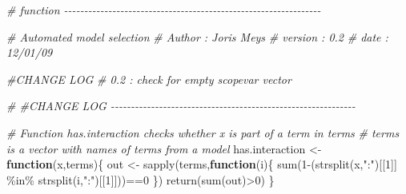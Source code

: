 \documentclass[
]{article}
\newenvironment{Shaded}{\begin{snugshade}}{\end{snugshade}}
\newcommand{\CommentTok}[1]{\textcolor[rgb]{0.56,0.35,0.01}{\textit{#1}}}
\newcommand{\ControlFlowTok}[1]{\textcolor[rgb]{0.13,0.29,0.53}{\textbf{#1}}}
\newcommand{\DecValTok}[1]{\textcolor[rgb]{0.00,0.00,0.81}{#1}}
\newcommand{\FunctionTok}[1]{\textcolor[rgb]{0.00,0.00,0.00}{#1}}
\newcommand{\NormalTok}[1]{#1}
\newcommand{\OtherTok}[1]{\textcolor[rgb]{0.56,0.35,0.01}{#1}}
\newcommand{\SpecialCharTok}[1]{\textcolor[rgb]{0.00,0.00,0.00}{#1}}
\newcommand{\StringTok}[1]{\textcolor[rgb]{0.31,0.60,0.02}{#1}}
\begin{document}
\begin{Shaded}
\begin{Highlighting}[]
\CommentTok{\# function {-}{-}{-}{-}{-}{-}{-}{-}{-}{-}{-}{-}{-}{-}{-}{-}{-}{-}{-}{-}{-}{-}{-}{-}{-}{-}{-}{-}{-}{-}{-}{-}{-}{-}{-}{-}{-}{-}{-}{-}{-}{-}{-}{-}{-}{-}{-}{-}{-}{-}{-}{-}{-}{-}{-}{-}{-}{-}{-}{-}{-}{-}{-}{-}}


\CommentTok{\# Automated model selection}
\CommentTok{\# Author      : Joris Meys}
\CommentTok{\# version     : 0.2}
\CommentTok{\# date        : 12/01/09}

\CommentTok{\#CHANGE LOG}
\CommentTok{\# 0.2   : check for empty scopevar vector}

\CommentTok{\# \#CHANGE LOG {-}{-}{-}{-}{-}{-}{-}{-}{-}{-}{-}{-}{-}{-}{-}{-}{-}{-}{-}{-}{-}{-}{-}{-}{-}{-}{-}{-}{-}{-}{-}{-}{-}{-}{-}{-}{-}{-}{-}{-}{-}{-}{-}{-}{-}{-}{-}{-}{-}{-}{-}{-}{-}{-}{-}{-}{-}{-}{-}{-}{-}}



\CommentTok{\# Function has.interaction checks whether x is part of a term in terms}
\CommentTok{\# terms is a vector with names of terms from a model}
\NormalTok{has.interaction }\OtherTok{\textless{}{-}} \ControlFlowTok{function}\NormalTok{(x,terms)\{}
\NormalTok{  out }\OtherTok{\textless{}{-}} \FunctionTok{sapply}\NormalTok{(terms,}\ControlFlowTok{function}\NormalTok{(i)\{}
    \FunctionTok{sum}\NormalTok{(}\DecValTok{1}\SpecialCharTok{{-}}\NormalTok{(}\FunctionTok{strsplit}\NormalTok{(x,}\StringTok{":"}\NormalTok{)[[}\DecValTok{1}\NormalTok{]] }\SpecialCharTok{\%in\%} \FunctionTok{strsplit}\NormalTok{(i,}\StringTok{":"}\NormalTok{)[[}\DecValTok{1}\NormalTok{]]))}\SpecialCharTok{==}\DecValTok{0}
\NormalTok{  \})}
  \FunctionTok{return}\NormalTok{(}\FunctionTok{sum}\NormalTok{(out)}\SpecialCharTok{\textgreater{}}\DecValTok{0}\NormalTok{)}
\NormalTok{\}}


\end{Highlighting}
\end{Shaded}
\end{document}
